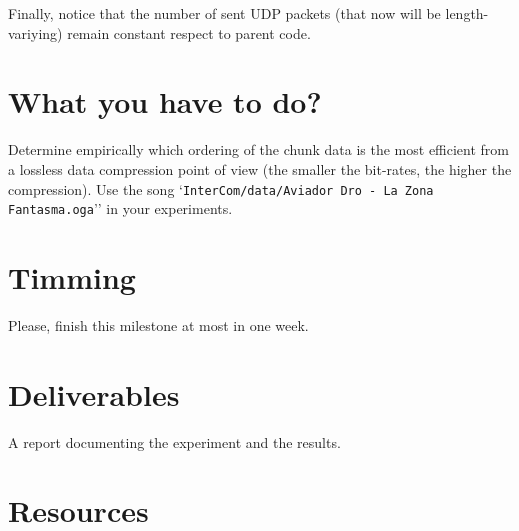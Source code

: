 Finally, notice that the number of sent UDP packets (that now will be
length-variying) remain constant respect to parent code.

\section{What you have to do?}

Determine empirically which ordering of the chunk data is the most
efficient from a lossless data compression point of view (the smaller
the bit-rates, the higher the compression). Use the song
`\verb|InterCom/data/Aviador Dro - La Zona Fantasma.oga|'' in your
experiments.

\section{Timming}

Please, finish this milestone at most in one week.

\section{Deliverables}

A report documenting the experiment and the results.


\section{Resources}


